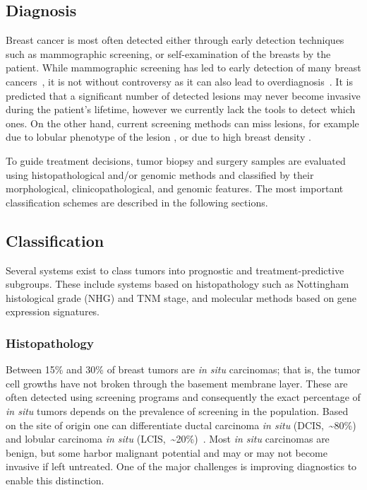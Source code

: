 \documentclass[11pt]{book}
\begin{document}
%
%
\subsection{Diagnosis}
\label{subsec:diagnosis}

Breast cancer is most often detected either through early detection techniques such as mammographic screening, or self-examination of the breasts by the patient. While mammographic screening has led to early detection of many breast cancers~\cite{Duffy:2020}, it is not without controversy as it can also lead to overdiagnosis~\cite{Loberg:2015}. It is predicted that a significant number of detected lesions may never become invasive during the patient's lifetime, however we currently lack the tools to detect which ones. On the other hand, current screening methods can miss lesions, for example due to lobular phenotype of the lesion \cite{Johnson:2015}, or due to high breast density \cite{VourtsisBerg:2018}.

To guide treatment decisions, tumor biopsy and surgery samples are evaluated using histopathological and/or genomic methods and classified by their morphological, clinicopathological, and genomic features. The most important classification schemes are described in the following sections.


%
%
\subsection{Classification}
\label{subsec:classification}

Several systems exist to class tumors into prognostic and treatment-predictive subgroups. These include systems based on histopathology such as Nottingham histological grade (NHG) and TNM stage, and molecular methods based on gene expression signatures.


\subsubsection{Histopathology}

Between 15\% and 30\% of breast tumors are \textit{in situ} carcinomas; that is, the tumor cell growths have not broken through the basement membrane layer. These are often detected using screening programs and consequently the exact percentage of \textit{in situ} tumors depends on the prevalence of screening in the population. Based on the site of origin one can differentiate ductal carcinoma \textit{in situ} (DCIS,~\textasciitilde80\%) and lobular carcinoma \textit{in situ} (LCIS,~\textasciitilde20\%)~\cite{Kumar:2009}. Most \textit{in situ} carcinomas are benign, but some harbor malignant potential and may or may not become invasive if left untreated. One of the major challenges is improving diagnostics to enable this distinction.
\end{document}
